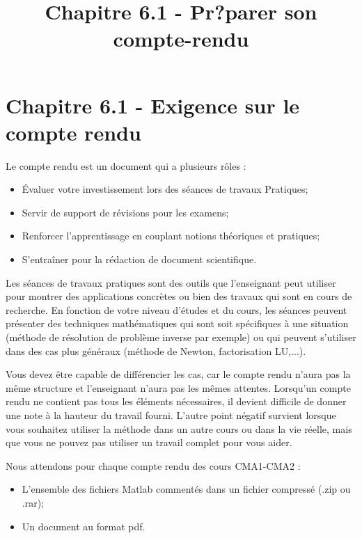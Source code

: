 \documentclass[11pt]{article}
\title{Chapitre 6.1 - Pr?parer son compte-rendu}
\providecommand{\tightlist}{%
      \setlength{\itemsep}{0pt}\setlength{\parskip}{0pt}}
\begin{document}
    
    
    \maketitle
    
    

    
    \section{Chapitre 6.1 - Exigence sur le compte
rendu}\label{chapitre-6.1---exigence-sur-le-compte-rendu}

Le compte rendu est un document qui a plusieurs rôles :

\begin{itemize}
\tightlist
\item
  Évaluer votre investissement lors des séances de travaux Pratiques;
\item
  Servir de support de révisions pour les examens;
\item
  Renforcer l'apprentissage en couplant notions théoriques et pratiques;
\item
  S'entraîner pour la rédaction de document scientifique.
\end{itemize}

Les séances de travaux pratiques sont des outils que l'enseignant peut
utiliser pour montrer des applications concrètes ou bien des travaux qui
sont en cours de recherche. En fonction de votre niveau d'études et du
cours, les séances peuvent présenter des techniques mathématiques qui
sont soit spécifiques à une situation (méthode de résolution de problème
inverse par exemple) ou qui peuvent s'utiliser dans des cas plus
généraux (méthode de Newton, factorisation LU,...).

Vous devez être capable de différencier les cas, car le compte rendu
n'aura pas la même structure et l'enseignant n'aura pas les mêmes
attentes. Lorsqu'un compte rendu ne contient pas tous les éléments
nécessaires, il devient difficile de donner une note à la hauteur du
travail fourni. L'autre point négatif survient lorsque vous souhaitez
utiliser la méthode dans un autre cours ou dans la vie réelle, mais que
vous ne pouvez pas utiliser un travail complet pour vous aider.

Nous attendons pour chaque compte rendu des cours CMA1-CMA2 :

\begin{itemize}
\tightlist
\item
  L'ensemble des fichiers Matlab commentés dans un fichier compressé
  (.zip ou .rar);
\item
  Un document au format pdf.
\end{itemize}
\end{document}
